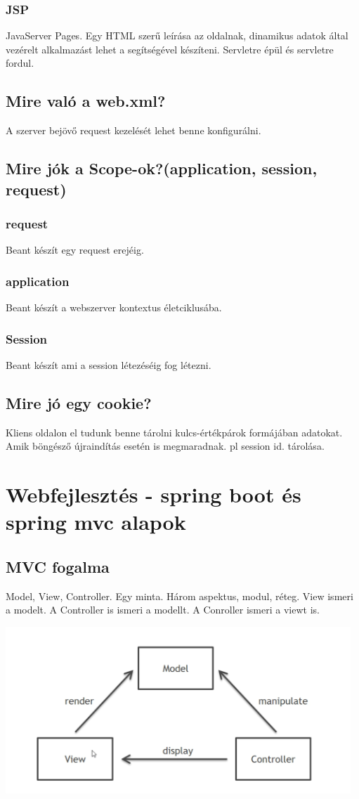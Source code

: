 \documentclass[a4paper,14pt]{extarticle}
\begin{document}
		\subsubsection{JSP}
		JavaServer Pages.
		Egy HTML szerű leírása az oldalnak, dinamikus adatok által vezérelt alkalmazást lehet a segítségével készíteni. Servletre épül és servletre fordul.
		\subsection{Mire való a web.xml?}
			A szerver bejövő request kezelését lehet benne konfigurálni.
		\subsection{Mire jók a Scope-ok?(application, session, request)}
			\subsubsection{request} Beant készít egy request erejéig.
			\subsubsection{application} Beant készít a webszerver kontextus életciklusába.
			\subsubsection{Session} Beant készít ami a session létezéséig fog létezni.
		\subsection{Mire jó egy cookie?}
		Kliens oldalon el tudunk benne tárolni kulcs-értékpárok formájában adatokat. Amik böngésző újraindítás esetén is megmaradnak. pl session id. tárolása.
	\section{Webfejlesztés - spring boot és spring mvc alapok}
		\subsection{MVC fogalma}
		Model, View, Controller.
		Egy minta.
		Három aspektus, modul, réteg.
		View ismeri a modelt.
		A Controller is ismeri a modellt.
		A Conroller ismeri a viewt is.
		\begin{center}
			\includegraphics[width=13cm]{mvc}
		\end{center}
\end{document}

